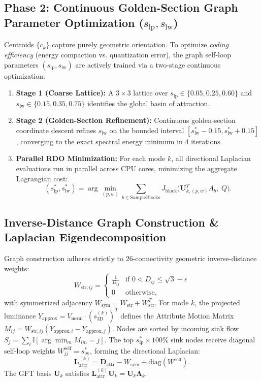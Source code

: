\documentclass[11pt,a4paper]{article}
\begin{document}
\subsection{Phase 2: Continuous Golden-Section Graph Parameter Optimization ($s_{\text{lp}}, s_{\text{lw}}$)}
Centroids $\{c_k\}$ capture purely geometric orientation. To optimize \emph{coding efficiency} (energy compaction vs. quantization error), the graph self-loop parameters $(s_{\text{lp}}, s_{\text{lw}})$ are actively trained via a two-stage continuous optimization:
\begin{enumerate}
  \item \textbf{Stage 1 (Coarse Lattice):} A $3 \times 3$ lattice over $s_{\text{lp}} \in \{0.05, 0.25, 0.60\}$ and $s_{\text{lw}} \in \{0.15, 0.35, 0.75\}$ identifies the global basin of attraction.
  \item \textbf{Stage 2 (Golden-Section Refinement):} Continuous golden-section coordinate descent refines $s_{\text{lw}}$ on the bounded interval $[s_{\text{lw}}^* - 0.15, s_{\text{lw}}^* + 0.15]$, converging to the exact spectral energy minimum in 4 iterations.
  \item \textbf{Parallel RDO Minimization:} For each mode $k$, all directional Laplacian evaluations run in parallel across CPU cores, minimizing the aggregate Lagrangian cost:
  \begin{equation}
    (s_{\text{lp}}^*, s_{\text{lw}}^*) = \arg\min_{(p, w)} \sum_{b \in \text{SampleBlocks}} J_{\text{block}}\Big(\mathbf{U}_{k,(p,w)}^T A_b, \; Q\Big).
  \end{equation}
\end{enumerate}

\subsection{Inverse-Distance Graph Construction \& Laplacian Eigendecomposition}
Graph construction adheres strictly to 26-connectivity geometric inverse-distance weights:
\begin{equation}
  W_{\text{str},ij} = 
  \begin{cases}
    \frac{1}{D_{ij}} & \text{if } 0 < D_{ij} \le \sqrt{3} + \epsilon \\[4pt]
    0 & \text{otherwise},
  \end{cases}
\end{equation}
with symmetrized adjacency $W_{\text{sym}} = W_{\text{str}} + W_{\text{str}}^T$. For mode $k$, the projected luminance $Y_{\text{approx}} = V_{\text{norm}} \cdot (s_{\text{3D}}^{(k)})^T$ defines the Attribute Motion Matrix $M_{ij} = W_{\text{str},ij} (Y_{\text{approx},i} - Y_{\text{approx},j})$. Nodes are sorted by incoming sink flow $S_j = \sum_i \mathbb{I}[\arg\min_m M_{im} = j]$. The top $s_{\text{lp}}^* \times 100\%$ sink nodes receive diagonal self-loop weights $W_{jj}^{\text{self}} = s_{\text{lw}}^*$, forming the directional Laplacian:
\begin{equation}
  \mathbf{L}_{\text{attr}}^{(k)} = \mathbf{D}_{\text{attr}} - W_{\text{sym}} + \mathrm{diag}(W^{\text{self}}).
\end{equation}
The GFT basis $\mathbf{U}_k$ satisfies $\mathbf{L}_{\text{attr}}^{(k)}\mathbf{U}_k = \mathbf{U}_k \mathbf{\Lambda}_k$.
\end{document}
